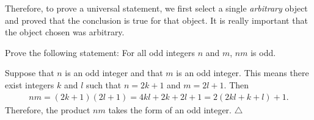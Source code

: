 Therefore, to prove a universal statement, we first select a single \textit{arbitrary} object and proved that the conclusion is true for that object. It is really important that the object chosen was arbitrary.

\begin{example}
Prove the following statement: For all odd integers $n$ and $m$, $nm$ is odd.
\end{example}

\begin{sol*}
Suppose that $n$ is an odd integer and that $m$ is an odd integer. This means there exist integers $k$ and $l$ such that $n = 2k + 1$ and $m = 2l + 1$. Then
	\begin{align*}
	nm = (2k + 1) (2l + 1) = 4kl + 2k + 2l + 1 = 2 (2kl + k + l) + 1 .
	\end{align*}
Therefore, the product $nm$ takes the form of an odd integer. \hfill $\triangle$
\end{sol*}


